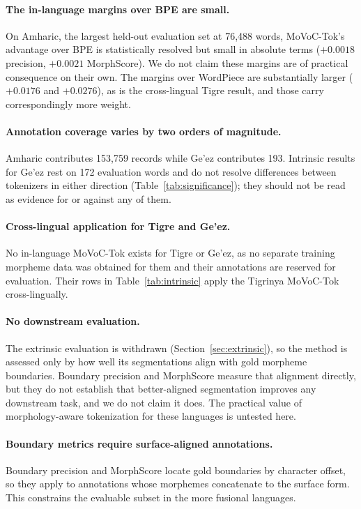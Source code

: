 \documentclass[11pt]{article}
\begin{document}
\paragraph{The in-language margins over BPE are small.}
On Amharic, the largest held-out evaluation set at 76,488 words, MoVoC-Tok's
advantage over BPE is statistically resolved but small in absolute terms
($+0.0018$ precision, $+0.0021$ MorphScore). We do not claim these margins are
of practical consequence on their own. The margins over WordPiece are
substantially larger ($+0.0176$ and $+0.0276$), as is the cross-lingual Tigre
result, and those carry correspondingly more weight.

\paragraph{Annotation coverage varies by two orders of magnitude.}
Amharic contributes 153,759 records while Ge'ez contributes 193. Intrinsic
results for Ge'ez rest on 172 evaluation words and do not resolve differences
between tokenizers in either direction (Table~\ref{tab:significance}); they
should not be read as evidence for or against any of them.

\paragraph{Cross-lingual application for Tigre and Ge'ez.}
No in-language MoVoC-Tok exists for Tigre or Ge'ez, as no separate training
morpheme data was obtained for them and their annotations are reserved for
evaluation. Their rows in Table~\ref{tab:intrinsic} apply the Tigrinya
MoVoC-Tok cross-lingually.

\paragraph{No downstream evaluation.}
The extrinsic evaluation is withdrawn (Section~\ref{sec:extrinsic}), so the
method is assessed only by how well its segmentations align with gold morpheme
boundaries. Boundary precision and MorphScore measure that alignment directly,
but they do not establish that better-aligned segmentation improves any
downstream task, and we do not claim it does. The practical value of
morphology-aware tokenization for these languages is untested here.

\paragraph{Boundary metrics require surface-aligned annotations.}
Boundary precision and MorphScore locate gold boundaries by character offset,
so they apply to annotations whose morphemes concatenate to the surface form.
This constrains the evaluable subset in the more fusional languages.
\end{document}
